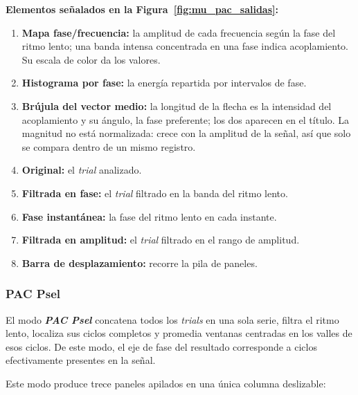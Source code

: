 \documentclass[11pt,a4paper]{article}
\newenvironment{senalamientos}[1]{%
  \par\noindent\textbf{Elementos se\~nalados en la Figura~\ref{#1}:}%
  \begin{enumerate}[label=(\arabic*),leftmargin=2.4em,itemsep=2pt,topsep=4pt]}
  {\end{enumerate}}
\begin{document}
    \begin{senalamientos}{fig:mu_pac_salidas}
        \item \textbf{Mapa fase/frecuencia:} la amplitud de cada frecuencia seg\'un la fase del ritmo lento; una banda intensa concentrada en una fase indica acoplamiento. Su escala de color da los valores.
        \item \textbf{Histograma por fase:} la energ\'ia repartida por intervalos de fase.
        \item \textbf{Br\'ujula del vector medio:} la longitud de la flecha es la intensidad del acoplamiento y su \'angulo, la fase preferente; los dos aparecen en el t\'itulo. La magnitud no est\'a normalizada: crece con la amplitud de la se\~nal, as\'i que solo se compara dentro de un mismo registro.
        \item \textbf{Original:} el \textit{trial} analizado.
        \item \textbf{Filtrada en fase:} el \textit{trial} filtrado en la banda del ritmo lento.
        \item \textbf{Fase instant\'anea:} la fase del ritmo lento en cada instante.
        \item \textbf{Filtrada en amplitud:} el \textit{trial} filtrado en el rango de amplitud.
        \item \textbf{Barra de desplazamiento:} recorre la pila de paneles.
    \end{senalamientos}


    \subsubsection{PAC Psel}
    El modo \textbf{\textit{PAC Psel}} concatena todos los \textit{trials} en una sola serie, filtra el ritmo lento, localiza sus ciclos completos y promedia ventanas centradas en los valles de esos ciclos. De este modo, el eje de fase del resultado corresponde a ciclos efectivamente presentes en la se\~nal.

    Este modo produce trece paneles apilados en una \'unica columna deslizable:
\end{document}
